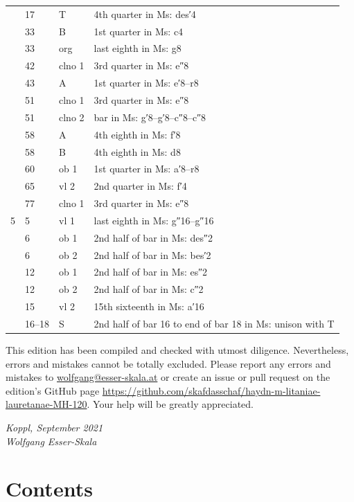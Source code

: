 \documentclass[parskip=full]{scrreprt}
\newif\iftemplate\templatetrue
\begin{document}
\begin{longtable}{lll L{10cm}}
    & 17 & T       & 4th quarter in Ms: des′4 \\
    & 33 & B       & 1st quarter in Ms: c4 \\
    & 33 & org     & last eighth in Ms: g8 \\
    & 42 & clno 1  & 3rd quarter in Ms: e″8 \\
    & 43 & A       & 1st quarter in Ms: e′8–r8 \\
    & 51 & clno 1  & 3rd quarter in Ms: e″8 \\
    & 51 & clno 2  & bar in Ms: g′8–g′8–c″8–c″8 \\
    & 58 & A       & 4th eighth in Ms: f′8 \\
    & 58 & B       & 4th eighth in Ms: d8 \\
    & 60 & ob 1    & 1st quarter in Ms: a′8–r8 \\
    & 65 & vl 2    & 2nd quarter in Ms: f′4 \\
    & 77 & clno 1  & 3rd quarter in Ms: e″8 \\
  5 & 5  & vl 1    & last eighth in Ms: g″16–g″16 \\
    & 6  & ob 1    & 2nd half of bar in Ms: des″2 \\
    & 6  & ob 2    & 2nd half of bar in Ms: bes′2 \\
    & 12 & ob 1    & 2nd half of bar in Ms: es″2 \\
    & 12 & ob 2    & 2nd half of bar in Ms: c″2 \\
    & 15 & vl 2    & 15th sixteenth in Ms: a′16 \\
    & 16–18 & S    & 2nd half of bar 16 to end of bar 18 in Ms: unison with T \\
  \bottomrule
\end{longtable}


This edition has been compiled and checked with utmost diligence. Nevertheless, errors and mistakes cannot be totally excluded. Please report any errors and mistakes to \url{wolfgang@esser-skala.at} or create an issue or pull request on the edition’s GitHub page \url{https://github.com/skafdasschaf/haydn-m-litaniae-lauretanae-MH-120}. Your help will be greatly appreciated.

\bigskip
\textit{Koppl, September 2021\\
Wolfgang Esser-Skala}

\cleardoublepage
\chapter*{Contents}


\cleardoublepage
\fi

\iftemplate

\fi
\end{document}
